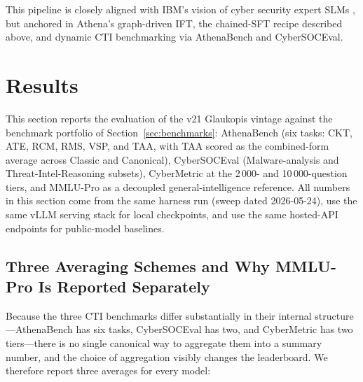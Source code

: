 \documentclass[unnumsec,webpdf,contemporary,large]{oup-authoring-template}
\theoremstyle{thmstyleone}
\theoremstyle{thmstyletwo}
\theoremstyle{thmstylethree}
\begin{document}
This pipeline is closely aligned with IBM's vision of cyber security expert SLMs \cite{levi2024cyberpal,levi2025toward}, but anchored in Athena's graph-driven IFT, the chained-SFT recipe described above, and dynamic CTI benchmarking via AthenaBench and CyberSOCEval.


\section{Results}
\label{sec:results}

This section reports the evaluation of the v21 Glaukopis vintage against the benchmark portfolio of Section~\ref{sec:benchmarks}: AthenaBench (six tasks: CKT, ATE, RCM, RMS, VSP, and TAA, with TAA scored as the combined-form average across Classic and Canonical), CyberSOCEval (Malware-analysis and Threat-Intel-Reasoning subsets), CyberMetric at the 2\,000- and 10\,000-question tiers, and MMLU-Pro as a decoupled general-intelligence reference. All numbers in this section come from the same harness run (sweep dated 2026-05-24), use the same vLLM serving stack for local checkpoints, and use the same hosted-API endpoints for public-model baselines.

\subsection{Three Averaging Schemes and Why MMLU-Pro Is Reported Separately}
\label{sec:results-averaging}

Because the three CTI benchmarks differ substantially in their internal structure---AthenaBench has six tasks, CyberSOCEval has two, and CyberMetric has two tiers---there is no single canonical way to aggregate them into a summary number, and the choice of aggregation visibly changes the leaderboard. We therefore report three averages for every model:
\end{document}
